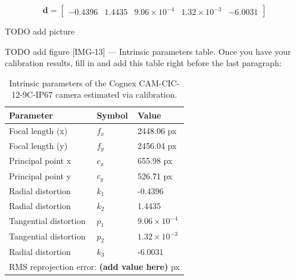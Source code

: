 \begin{equation}
	\mathbf{d} =
	\begin{bmatrix}
		-0.4396 & 1.4435 & 9.06\times10^{-4} & 1.32\times10^{-3} & -6.0031
	\end{bmatrix}
\end{equation}


TODO add picture






TODO add figure
[IMG-13] — Intrinsic parameters table. Once you have your calibration results, fill in and add this table right before the last paragraph:
\begin{table}[htbp]
	\centering
	\caption{Intrinsic parameters of the Cognex CAM-CIC-12-9C-IP67 camera estimated via calibration.}
	\label{tab:intrinsics}
	\begin{tabular}{lll}
		\toprule
		\textbf{Parameter} & \textbf{Symbol} & \textbf{Value} \\
		\midrule
		Focal length (x) & $f_x$ & 2448.06 px \\
		Focal length (y) & $f_y$ & 2456.04 px \\
		Principal point x & $c_x$ & 655.98 px \\
		Principal point y & $c_y$ & 526.71 px \\
		\midrule
		Radial distortion & $k_1$ & -0.4396 \\
		Radial distortion & $k_2$ & 1.4435 \\
		Tangential distortion & $p_1$ & $9.06 \times 10^{-4}$ \\
		Tangential distortion & $p_2$ & $1.32 \times 10^{-3}$ \\
		Radial distortion & $k_3$ & -6.0031 \\
		\midrule
		\multicolumn{3}{l}{RMS reprojection error: \textbf{(add value here)} px} \\
		\bottomrule
	\end{tabular}
\end{table}

